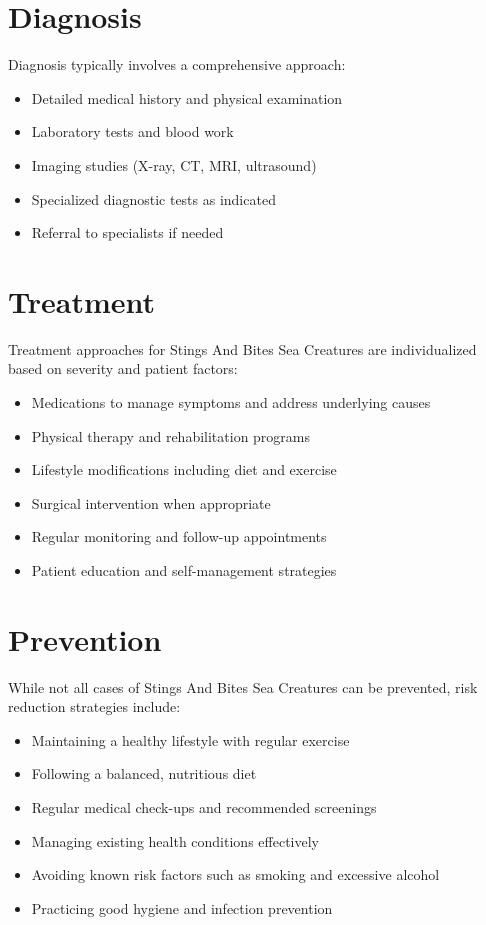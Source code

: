 \section*{Diagnosis}
Diagnosis typically involves a comprehensive approach:

\begin{itemize}
\item Detailed medical history and physical examination
\item Laboratory tests and blood work
\item Imaging studies (X-ray, CT, MRI, ultrasound)
\item Specialized diagnostic tests as indicated
\item Referral to specialists if needed
\end{itemize}

\section*{Treatment}
Treatment approaches for Stings And Bites Sea Creatures are individualized based on severity and patient factors:

\begin{itemize}
\item Medications to manage symptoms and address underlying causes
\item Physical therapy and rehabilitation programs
\item Lifestyle modifications including diet and exercise
\item Surgical intervention when appropriate
\item Regular monitoring and follow-up appointments
\item Patient education and self-management strategies
\end{itemize}

\section*{Prevention}
While not all cases of Stings And Bites Sea Creatures can be prevented, risk reduction strategies include:

\begin{itemize}
\item Maintaining a healthy lifestyle with regular exercise
\item Following a balanced, nutritious diet
\item Regular medical check-ups and recommended screenings
\item Managing existing health conditions effectively
\item Avoiding known risk factors such as smoking and excessive alcohol
\item Practicing good hygiene and infection prevention
\end{itemize}


